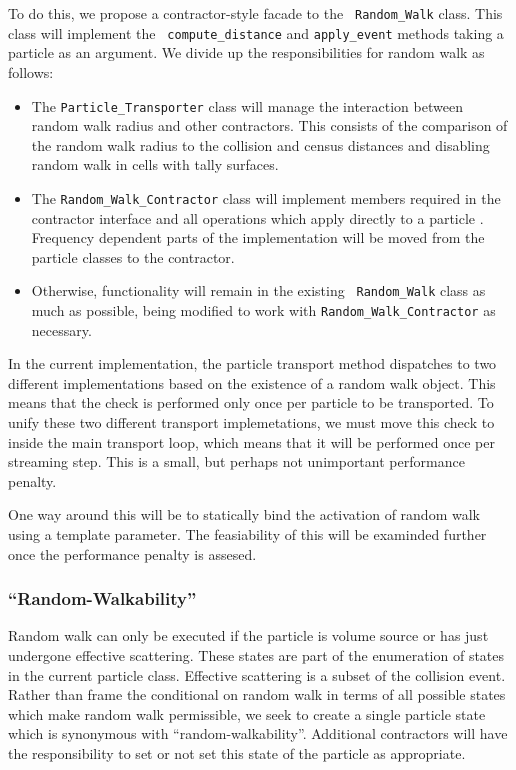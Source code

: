 \documentclass[memo]{ResearchNote}
\begin{document}
To do this, we propose a contractor-style facade to the {\tt
  Random\_Walk} class. This class will implement the {\tt
  compute\_distance} and {\tt apply\_event} methods taking a particle as
an argument. We divide up the responsibilities for random walk as
follows:

\begin{itemize}
\item The {\tt Particle\_Transporter} class will manage the
  interaction between random walk radius and other contractors. 
  This consists of the comparison of the random walk radius to the
  collision and census distances and disabling random walk in
  cells with tally surfaces. 
\item The {\tt Random\_Walk\_Contractor} class will implement members
  required in the contractor interface and all operations which apply
  directly to a particle . Frequency dependent parts of the
  implementation will be moved from the particle classes to the
  contractor.
\item Otherwise, functionality will remain in the existing {\tt
    Random\_Walk} class as much as possible, being modified to work
  with {\tt Random\_Walk\_Contractor} as necessary.
\end{itemize}

In the current implementation, the particle transport method
dispatches to two different implementations based on the existence of
a random walk object. This means that the check is performed only once
per particle to be transported. To unify these two different transport
implemetations, we must move this check to inside the main transport
loop, which means that it will be performed once per streaming step.
This is a small, but perhaps not unimportant performance penalty.

One way around this will be to statically bind the activation of
random walk using a template parameter. The feasiability of this will
be examinded further once the performance penalty is assesed.

\subsubsection{``Random-Walkability''}

Random walk can only be executed if the particle is volume source or
has just undergone effective scattering. These states are part of the
enumeration of states in the current particle class.  Effective
scattering is a subset of the collision event. Rather than frame the
conditional on random walk in terms of all possible states which make
random walk permissible, we seek to create a single particle state
which is synonymous with ``random-walkability''. Additional
contractors will have the responsibility to set or not set this state
of the particle as appropriate.
\end{document}
